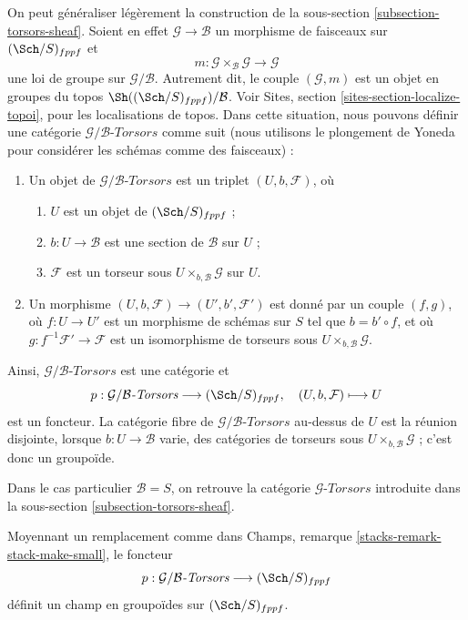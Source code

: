 \noindent
On peut généraliser légèrement la construction de la
sous-section \ref{subsection-torsors-sheaf}.
Soient en effet $\mathcal{G} \to \mathcal{B}$ un morphisme de faisceaux
sur $(\Sch/S)_{fppf}$ et
$$
m :
\mathcal{G} \times_\mathcal{B} \mathcal{G}
\longrightarrow
\mathcal{G}
$$
une loi de groupe sur $\mathcal{G}/\mathcal{B}$. Autrement dit, le couple
$(\mathcal{G}, m)$ est un objet en groupes du topos
$\Sh((\Sch/S)_{fppf})/\mathcal{B}$. Voir
Sites, section \ref{sites-section-localize-topoi},
pour les localisations de topos.
Dans cette situation, nous pouvons définir une catégorie
$\mathcal{G}/\mathcal{B}\textit{-Torsors}$ comme suit
(nous utilisons le plongement de Yoneda pour considérer les schémas comme des faisceaux) :
\begin{enumerate}
\item Un objet de $\mathcal{G}/\mathcal{B}\textit{-Torsors}$ est un triplet
$(U, b, \mathcal{F})$, où
\begin{enumerate}
\item $U$ est un objet de $(\Sch/S)_{fppf}$ ;
\item $b : U \to \mathcal{B}$ est une section de $\mathcal{B}$ sur $U$ ;
\item $\mathcal{F}$ est un torseur sous $U \times_{b, \mathcal{B}}\mathcal{G}$
sur $U$.
\end{enumerate}
\item Un morphisme $(U, b, \mathcal{F}) \to (U', b', \mathcal{F}')$ est donné
par un couple $(f, g)$, où $f : U \to U'$ est un morphisme de schémas
sur $S$ tel que $b = b' \circ f$, et où
$g : f^{-1}\mathcal{F}' \to \mathcal{F}$ est un
isomorphisme de torseurs sous $U \times_{b, \mathcal{B}} \mathcal{G}$.
\end{enumerate}
Ainsi, $\mathcal{G}/\mathcal{B}\textit{-Torsors}$ est une catégorie et
$$
p :
\mathcal{G}/\mathcal{B}\textit{-Torsors}
\longrightarrow
(\Sch/S)_{fppf},
\quad
(U, b, \mathcal{F}) \longmapsto U
$$
est un foncteur. La catégorie fibre de
$\mathcal{G}/\mathcal{B}\textit{-Torsors}$
au-dessus de $U$ est la réunion disjointe, lorsque $b : U \to \mathcal{B}$ varie,
des catégories de torseurs sous $U \times_{b, \mathcal{B}} \mathcal{G}$ ;
c'est donc un groupoïde.

\medskip\noindent
Dans le cas particulier $\mathcal{B} = S$, on retrouve la catégorie
$\mathcal{G}\textit{-Torsors}$ introduite dans la
sous-section \ref{subsection-torsors-sheaf}.

\begin{lemma}
\label{lemma-variant-torsors-sheaf-stack-in-groupoids}
Moyennant un remplacement comme dans
Champs, remarque \ref{stacks-remark-stack-make-small},
le foncteur
$$
p :
\mathcal{G}/\mathcal{B}\textit{-Torsors}
\longrightarrow
(\Sch/S)_{fppf}
$$
définit un champ en groupoïdes sur $(\Sch/S)_{fppf}$.
\end{lemma}

